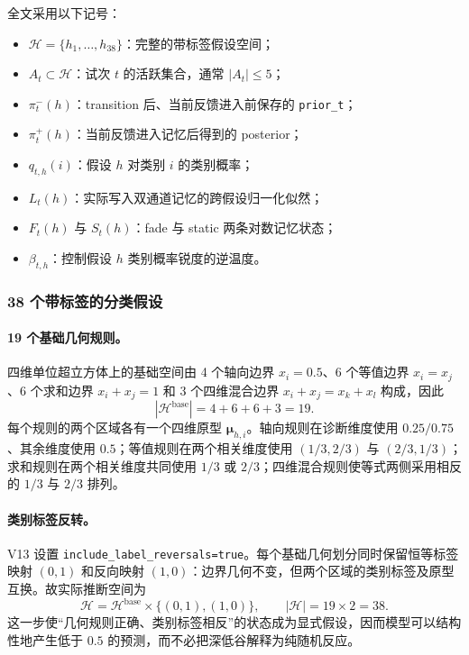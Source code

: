 全文采用以下记号：
\begin{itemize}
    \item $\mathcal H=\{h_1,\ldots,h_{38}\}$：完整的带标签假设空间；
    \item $A_t\subset\mathcal H$：试次 $t$ 的活跃集合，通常 $|A_t|\leq5$；
    \item $\pi_t^-(h)$：transition 后、当前反馈进入前保存的 \texttt{prior\_t}；
    \item $\pi_t^+(h)$：当前反馈进入记忆后得到的 posterior；
    \item $q_{t,h}(i)$：假设 $h$ 对类别 $i$ 的类别概率；
    \item $L_t(h)$：实际写入双通道记忆的跨假设归一化似然；
    \item $F_t(h)$ 与 $S_t(h)$：fade 与 static 两条对数记忆状态；
    \item $\beta_{t,h}$：控制假设 $h$ 类别概率锐度的逆温度。
\end{itemize}


\subsubsection{38 个带标签的分类假设}

\paragraph{19 个基础几何规则。}
四维单位超立方体上的基础空间由 4 个轴向边界 $x_i=0.5$、6 个等值边界 $x_i=x_j$、6 个求和边界 $x_i+x_j=1$ 和 3 个四维混合边界 $x_i+x_j=x_k+x_l$ 构成，因此
\begin{equation}
    |\mathcal H^{\mathrm{base}}|=4+6+6+3=19.
    \label{eq:modelv13-base-hypotheses}
\end{equation}
每个规则的两个区域各有一个四维原型 $\boldsymbol\mu_{h,i}$。轴向规则在诊断维度使用 $0.25/0.75$、其余维度使用 $0.5$；等值规则在两个相关维度使用 $(1/3,2/3)$ 与 $(2/3,1/3)$；求和规则在两个相关维度共同使用 $1/3$ 或 $2/3$；四维混合规则使等式两侧采用相反的 $1/3$ 与 $2/3$ 排列。

\paragraph{类别标签反转。}
V13 设置 \texttt{include\_label\_reversals=true}。每个基础几何划分同时保留恒等标签映射 $(0,1)$ 和反向映射 $(1,0)$：边界几何不变，但两个区域的类别标签及原型互换。故实际推断空间为
\begin{equation}
    \mathcal H
    =\mathcal H^{\mathrm{base}}\times\{(0,1),(1,0)\},
    \qquad |\mathcal H|=19\times2=38.
    \label{eq:modelv13-labelled-space}
\end{equation}
这一步使“几何规则正确、类别标签相反”的状态成为显式假设，因而模型可以结构性地产生低于 $0.5$ 的预测，而不必把深低谷解释为纯随机反应。

